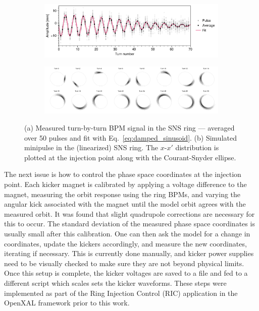 \begin{figure}[!p]
    \centering
    \begin{subfigure}{\textwidth}
        \includegraphics[width=\textwidth]{Images/chapter1/bpm_avg.png}
        \caption{}
        \label{fig:bpm_avg}
    \end{subfigure}
    \vfill
    \vspace*{0.5cm}
    \vfill
    \begin{subfigure}{\textwidth}
         \includegraphics[width=\textwidth]{Images/chapter1/minipulse_chromaticity_black.png}
        \caption{}
        \label{fig:minipulse}
    \end{subfigure}
    \caption{(a) Measured turn-by-turn BPM signal in the SNS ring — averaged over 50 pulses and fit with Eq.~\eqref{eq:damped_sinusoid}. (b) Simulated minipulse in the (linearized) SNS ring. The $x$-$x'$ distribution is plotted at the injection point along with the Courant-Snyder ellipse.}
    \label{fig:bpm_fits}
\end{figure}
%

The next issue is how to control the phase space coordinates at the injection point. Each kicker magnet is calibrated by applying a voltage difference to the magnet, measuring the orbit response using the ring BPMs, and varying the angular kick associated with the magnet until the model orbit agrees with the measured orbit. It was found that slight quadrupole corrections are necessary for this to occur. The standard deviation of the measured phase space coordinates is usually small after this calibration. One can then ask the model for a change in coordinates, update the kickers accordingly, and measure the new coordinates, iterating if necessary. This is currently done manually, and kicker power supplies need to be visually checked to make sure they are not beyond physical limits. Once this setup is complete, the kicker voltages are saved to a file and fed to a different script which scales sets the kicker waveforms. These steps were implemented as part of the Ring Injection Control (RIC) application in the OpenXAL framework \cite{Milas2021} prior to this work.

